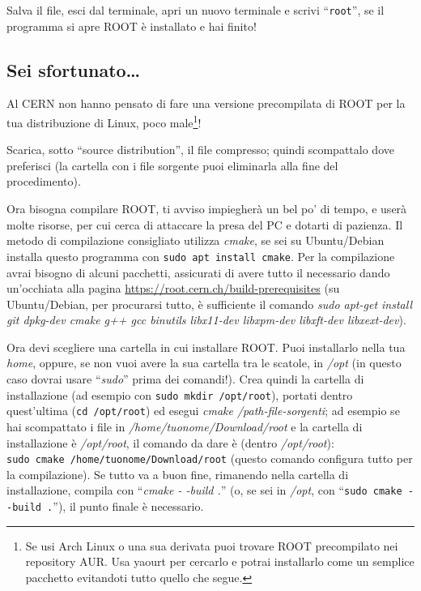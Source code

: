 Salva il file, esci dal terminale, apri un nuovo terminale e scrivi ``\verb|root|'', se il programma si apre ROOT è installato e hai finito!
\subsection{Sei sfortunato\ldots}\label{distronotfound}
Al CERN non hanno pensato di fare una versione precompilata di ROOT per la tua distribuzione di Linux, poco male\footnote{Se usi Arch Linux o una sua derivata puoi trovare ROOT precompilato nei repository AUR. Usa yaourt per cercarlo e potrai installarlo come un semplice pacchetto evitandoti tutto quello che segue.}! 

Scarica, sotto ``source distribution'', il file compresso; quindi scompattalo dove preferisci (la cartella con i file sorgente puoi eliminarla alla fine del procedimento). 

Ora bisogna compilare ROOT, ti avviso impiegherà un bel po' di tempo, e userà molte risorse, per cui cerca di attaccare la presa del PC e dotarti di pazienza.  Il metodo di compilazione consigliato utilizza \emph{cmake}, se sei su Ubuntu/Debian installa questo programma con \verb|sudo apt install cmake|. Per la compilazione avrai bisogno di alcuni pacchetti, assicurati di avere tutto il necessario dando un'occhiata alla pagina \url{https://root.cern.ch/build-prerequisites} (su Ubuntu/Debian, per procurarsi tutto, è sufficiente il comando \emph{sudo apt-get install git dpkg-dev cmake g++ gcc binutils libx11-dev libxpm-dev libxft-dev libxext-dev}). 

Ora devi scegliere una cartella in cui installare ROOT. Puoi installarlo nella tua \emph{home}, oppure, se non vuoi avere la sua cartella tra le scatole, in \emph{/opt} (in questo caso dovrai usare ``\emph{sudo}'' prima dei comandi!). Crea quindi la cartella di installazione (ad esempio con \verb|sudo mkdir /opt/root|), portati dentro quest'ultima  (\verb|cd /opt/root|) ed esegui \emph{cmake /path-file-sorgenti}; ad esempio se hai scompattato i file in \emph{/home/tuonome/Download/root} e la cartella di installazione è \emph{/opt/root}, il comando da dare è (dentro \emph{/opt/root}): \\ \verb|sudo cmake /home/tuonome/Download/root| (questo comando configura tutto per la compilazione). Se tutto va a buon fine, rimanendo nella cartella di installazione, compila con ``\emph{cmake - -build .}'' (o, se sei in \emph{/opt}, con ``\verb|sudo cmake --build .|''), il punto finale è necessario.


